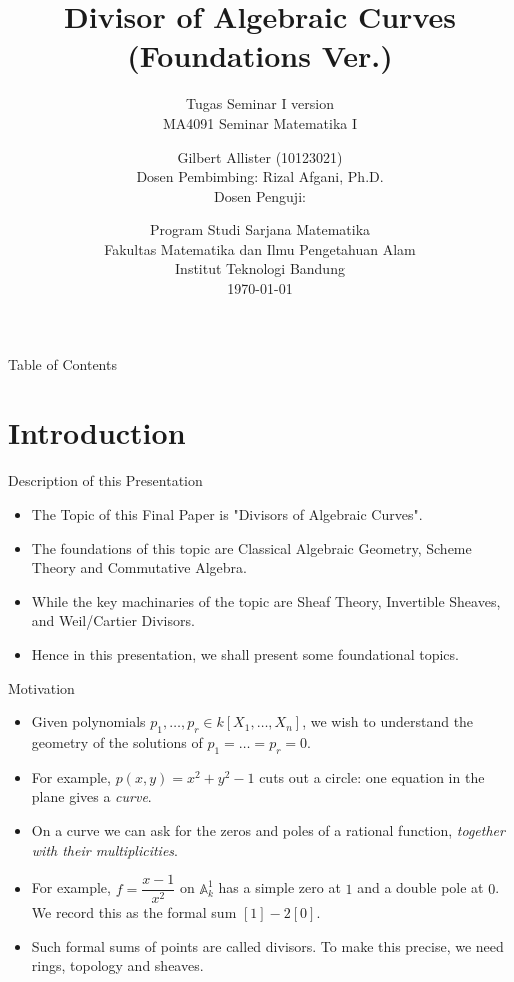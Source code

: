 \documentclass[8pt]{beamer}
\title[Divisor of Algebraic Curves\texorpdfstring{\quad\insertframenumber/\inserttotalframenumber}{}]{Divisor of Algebraic Curves (Foundations Ver.)}
\subtitle{
Tugas Seminar I version \\    
MA4091 Seminar Matematika I}
\author[G. Allister (10123021)]{Gilbert Allister (10123021) \\
Dosen Pembimbing: Rizal Afgani, Ph.D. \\
Dosen Penguji: 
}
\date{ \fontsize{8pt}{8pt}\selectfont
  Program Studi Sarjana Matematika \\
  Fakultas Matematika dan Ilmu Pengetahuan Alam \\
  Institut Teknologi Bandung \\[1cm]
  \today} %
\newcommand{\A}{\mathbb{A}}
\theoremstyle{definition}
\begin{document}
    \frame{\titlepage}

    \begin{frame}{Table of Contents}
        \tableofcontents
    \end{frame}

    \section{Introduction}

    \begin{frame}{Description of this Presentation}
        \begin{itemize}
            \item The Topic of this Final Paper is "Divisors of Algebraic Curves".
            \item The foundations of this topic are Classical Algebraic Geometry, Scheme Theory and Commutative Algebra.
            \item While the key machinaries of the topic are Sheaf Theory, Invertible Sheaves, and Weil/Cartier Divisors. 
            \item Hence in this presentation, we shall present some foundational topics.
        \end{itemize}
    \end{frame}


    \begin{frame}{Motivation}
        \begin{itemize}
            \item Given polynomials $p_1, \dots, p_r \in k[X_1, \dots, X_n]$, we wish to understand the geometry of the solutions of $p_1 = \dots = p_r = 0$.
            \item For example, $p(x,y) = x^2 + y^2 - 1$ cuts out a circle: one equation in the plane gives a \emph{curve}.
            \item On a curve we can ask for the zeros and poles of a rational function, \emph{together with their multiplicities}.
            \item For example, $f = \dfrac{x-1}{x^2}$ on $\A^1_k$ has a simple zero at $1$ and a double pole at $0$. We record this as the formal sum $[1] - 2[0]$.
            \item Such formal sums of points are called \alert{divisors}. To make this precise, we need rings, topology and sheaves.
        \end{itemize}
    \end{frame}
\end{document}
